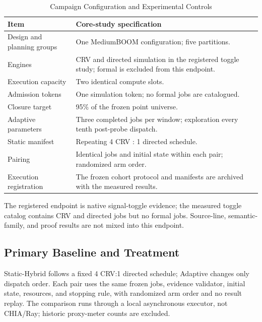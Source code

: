 \documentclass[conference,letterpaper]{IEEEtran}
\begin{document}
\begin{table}[t]
\caption{Campaign Configuration and Experimental Controls}
\label{tab:config}
\centering\footnotesize
\begin{tabular}{@{}L{0.34\columnwidth}L{0.61\columnwidth}@{}}
\toprule
Item & Core-study specification \\
\midrule
Design and planning groups & One MediumBOOM configuration; five partitions. \\
Engines & CRV and directed simulation in the registered toggle study; formal is excluded from this endpoint. \\
Execution capacity & Two identical compute slots. \\
Admission tokens & One simulation token; no formal jobs are catalogued. \\
Closure target & 95\% of the frozen point universe. \\
Adaptive parameters & Three completed jobs per window; exploration every tenth post-probe dispatch. \\
Static manifest & Repeating 4 CRV : 1 directed schedule. \\
Pairing & Identical jobs and initial state within each pair; randomized arm order. \\
Execution registration & The frozen cohort protocol and manifests are archived with the measured results. \\
\bottomrule
\end{tabular}
\end{table}

The registered endpoint is native signal-toggle evidence; the measured toggle catalog contains CRV and directed jobs but no formal jobs. Source-line, semantic-family, and proof results are not mixed into this endpoint.

\subsection{Primary Baseline and Treatment}
Static-Hybrid follows a fixed 4 CRV:1 directed schedule; Adaptive changes only dispatch order. Each pair uses the same frozen jobs, evidence validator, initial state, resources, and stopping rule, with randomized arm order and no result replay. The comparison runs through a local asynchronous executor, not CHIA/Ray; historic proxy-meter counts are excluded.
\end{document}
